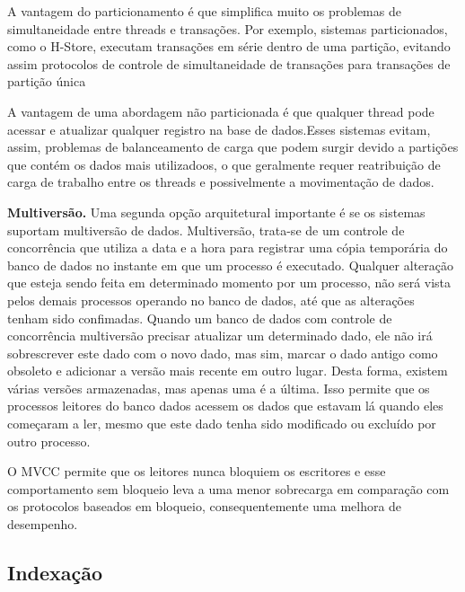     
A vantagem do particionamento é que simplifica muito os problemas de simultaneidade entre threads e transações. Por exemplo, sistemas particionados, como o H-Store, executam transações em série dentro de uma partição, evitando assim protocolos de controle de simultaneidade de transações para transações de partição única
    
A vantagem de uma abordagem não particionada é que qualquer thread pode acessar e atualizar qualquer registro na base de dados.Esses sistemas evitam, assim, problemas de balanceamento de carga que podem surgir devido a partições que contém os dados mais utilizadoos, o que geralmente requer reatribuição de carga de trabalho entre os threads e possivelmente a movimentação de dados.
    
    
\textbf{Multiversão.} Uma segunda opção arquitetural importante é se os sistemas suportam multiversão de dados. Multiversão, trata-se de um controle de concorrência que utiliza a data e a hora para registrar uma cópia temporária do banco de dados no instante em que um processo é executado.  Qualquer alteração que esteja sendo feita em determinado momento por um processo, não será vista pelos demais processos operando no banco de dados, até que as alterações tenham sido confimadas. Quando um banco de dados com controle de concorrência multiversão precisar atualizar um determinado dado, ele não irá sobrescrever este dado com o novo dado, mas sim, marcar o dado antigo como obsoleto e adicionar a versão mais recente em outro lugar. Desta forma, existem várias versões armazenadas, mas apenas uma é a última. Isso permite que os processos leitores do banco dados acessem os dados que estavam lá quando eles começaram a ler, mesmo que este dado tenha sido modificado ou excluído por outro processo. \cite{Bernstein}

O \ac{MVCC} permite que os leitores nunca bloquiem os escritores e esse comportamento sem bloqueio leva a uma menor sobrecarga em comparação com os protocolos baseados em bloqueio, consequentemente uma melhora de desempenho. 


\subsection{Indexação}




    
